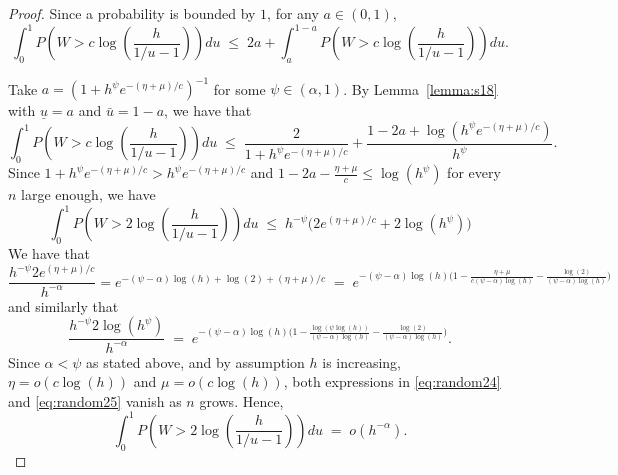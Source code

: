 \documentclass[
  12pt]{article}
\newtheorem{lem}[thm]{\textsc{Lemma}}
\begin{document}
\begin{proof}
Since a probability is bounded by $1$, for any $a\in(0,1)$,
\begin{equation}\label{eq:basebound}
    \int_0^1 P\left(W>c \log \left(\frac{h}{1 / u-1}\right)\right) d u \;\leq\; 2 a+\int_{a}^{1-a} P\left(W>c\log\left(\frac{h}{1 / u-1}\right)\right) d u.
\end{equation}

Take $a=\left(1+h^{\psi}e^{-(\eta+\mu)/ c}\right)^{-1}$ for some $\psi\in(\alpha,1)$. By Lemma~\ref{lemma:s18} with $\underline{u}=a$ and $\bar{u}=1-a$, we have that
$$
\int_0^1 P\left(W>c \log \left(\frac{h}{1 / u-1}\right)\right) d u \;\leq\; \frac{2}{1+h^{\psi}e^{-(\eta+\mu)/c}}+ 
\frac{1-2a+\log(h^{\psi}e^{-(\eta+\mu)/c})}{h^{\psi}}. $$
Since $1+h^{\psi}e^{-(\eta+\mu)/ c}>h^{\psi}e^{-(\eta+\mu)/ c}$ and $1-2a-\frac{\eta+\mu}{c}\leq \log(h^\psi)$ for every $n$ large enough, we have
$$
\int_0^1 P\left(W>2 \log \left(\frac{h}{1 / u-1}\right)\right) d u \;\leq\; h^{-\psi}\big(2e^{(\eta+\mu)/ c}+2\log(h^{\psi})\big) $$
We have that
\begin{equation}\label{eq:random24}
    \frac{h^{-\psi}2e^{(\eta+\mu)/ c}}{h^{-\alpha}} 
= e^{-(\psi-\alpha) \log(h) + \log(2) + (\eta + \mu)/c}
    \;=\;e^{-(\psi-\alpha)\log(h)\big(1-\frac{\eta+\mu}{c(\psi-\alpha)\log(h)}- \frac{\log(2)}{(\psi-\alpha)\log(h)}\big)}
\end{equation}
and similarly that
\begin{equation}\label{eq:random25}
    \frac{h^{-\psi}2\log(h^{\psi})}{h^{-\alpha}} \;=\;e^{-(\psi-\alpha)\log(h)\big(1-\frac{\log(\psi\log(h))}{(\psi-\alpha)\log(h)}- \frac{\log(2)}{(\psi-\alpha)\log(h)}\big)}.
\end{equation}
Since $\alpha<\psi$ as stated above, and by assumption $h$ is increasing, $\eta=o(c\log(h))$ and $\mu=o(c\log(h))$, both expressions in \eqref{eq:random24} and \eqref{eq:random25} vanish as $n$ grows. Hence, 
$$\int_0^1 P\left(W>2 \log \left(\frac{h}{1 / u-1}\right)\right) d u \;=\; o(h^{-\alpha}).$$
\end{proof}


\end{document}
